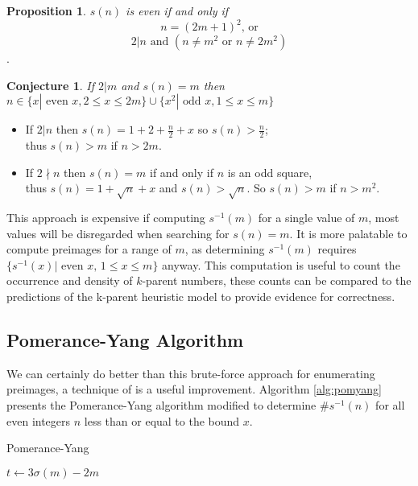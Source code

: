 \documentclass{article}
\theoremstyle{definition}
\newtheorem{conjecture}{Conjecture}[section]
\newtheorem{proposition}{Proposition}[section]
\begin{document}
\begin{proposition} \textit{$s(n)$ is even if and only if}
    $$n = (2m+1)^2 \text{, or}$$
    $$2 | n \text{ and } (n \neq m^2 \text{ or } n \neq 2m^2)$$.
\end{proposition}
\pagebreak
\begin{conjecture} \textit{If $2 | m$ and $s(n) = m$ then $n \in \{x| \text{ even } x, 2 \leq x \leq 2m \} \cup \{x^2| \text{ odd } x, 1 \leq x \leq m\}$}
    \begin{itemize}
        \item If $2 | n$ then $s(n) = 1+ 2 + \frac{n}{2} + x $ so $s(n) > \frac{n}{2}$;\\
              thus $s(n) > m$ if $n > 2m$.

        \item If $2 \nmid n$ then $s(n) = m$ if and only if $n$ is an odd square,\\
              thus $s(n) = 1 + \sqrt{n} + x$ and $s(n) > \sqrt{n}$. So $s(n) > m$ if $n > m^2$.

    \end{itemize}
\end{conjecture}



This approach is expensive if computing $s^{-1}(m)$ for a single value of $m$, most values will be disregarded when searching for $s(n) = m$. It is more palatable to compute preimages for a range of $m$, as determining $s^{-1}(m)$ requires $\{s^{-1}(x)|\text{ even } x,\, 1 \leq x \leq m\}$ anyway. This computation is useful to count the occurrence and density of $k$-parent numbers, these counts can be compared to the predictions of the k-parent heuristic model to provide evidence for correctness.

\subsection{Pomerance-Yang Algorithm}
We can certainly do better than this brute-force approach for enumerating preimages, a technique of \cite{pomYang} is a useful improvement. Algorithm \ref{alg:pomyang} presents the Pomerance-Yang algorithm modified to determine $\#s^{-1}(n)$ for all even integers $n$ less than or equal to the bound $x$.

\begin{algorithm}[H]
    \caption{Pomerance-Yang}
    \label{alg:pomyang}
    \begin{algorithmic}[1]
        \State $t \gets 3\sigma(m) - 2m$
        \EndWhile
        \EndIf
         
        \EndIf
        \EndFor
        \ForAll{odd composite $m \in [1, x^{2/3})$}
        \EndIf
        \EndFor
        \EndProcedure
    \end{algorithmic}
\end{algorithm}
\end{document}
